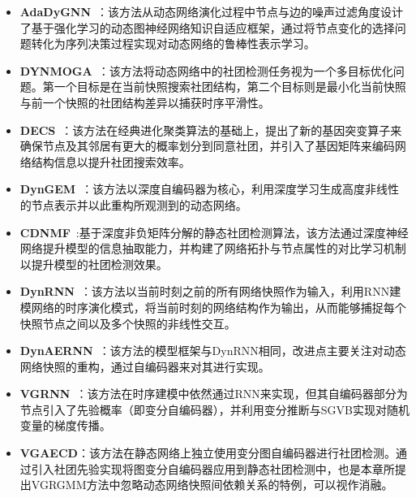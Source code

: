 \begin{itemize}
 	\item \textbf{AdaDyGNN}~\cite{Li2024DyGNN}：该方法从动态网络演化过程中节点与边的噪声过滤角度设计了基于强化学习的动态图神经网络知识自适应框架，通过将节点变化的选择问题转化为序列决策过程实现对动态网络的鲁棒性表示学习。
    \item \textbf{DYNMOGA}~\cite{folino2013evolutionary}：该方法将动态网络中的社团检测任务视为一个多目标优化问题。第一个目标是在当前快照搜索社团结构，第二个目标则是最小化当前快照与前一个快照的社团结构差异以捕获时序平滑性。
    \item \textbf{DECS}~\cite{liu2020detecting}：该方法在经典进化聚类算法的基础上，提出了新的基因突变算子来确保节点及其邻居有更大的概率划分到同意社团，并引入了基因矩阵来编码网络结构信息以提升社团搜索效率。
    \item \textbf{DynGEM}~\cite{goyal2018dyngem}：该方法以深度自编码器为核心，利用深度学习生成高度非线性的节点表示并以此重构所观测到的动态网络。
	\item \textbf{CDNMF}~\cite{li2024contrastive}:基于深度非负矩阵分解的静态社团检测算法，该方法通过深度神经网络提升模型的信息抽取能力，并构建了网络拓扑与节点属性的对比学习机制以提升模型的社团检测效果。
    \item \textbf{DynRNN}~\cite{goyal2020dyngraph2vec}：该方法以当前时刻之前的所有网络快照作为输入，利用RNN建模网络的时序演化模式，将当前时刻的网络结构作为输出，从而能够捕捉每个快照节点之间以及多个快照的非线性交互。
    \item \textbf{DynAERNN}~\cite{goyal2020dyngraph2vec}：该方法的模型框架与DynRNN相同，改进点主要关注对动态网络快照的重构，通过自编码器来对其进行实现。
    \item \textbf{VGRNN}~\cite{hajiramezanali2019variational}：该方法在时序建模中依然通过RNN来实现，但其自编码器部分为节点引入了先验概率（即变分自编码器），并利用变分推断与SGVB实现对随机变量的梯度传播。
    \item \textbf{VGAECD}：该方法在静态网络上独立使用变分图自编码器进行社团检测。通过引入社团先验实现将图变分自编码器应用到静态社团检测中，也是本章所提出VGRGMM方法中忽略动态网络快照间依赖关系的特例，可以视作消融。
\end{itemize}


